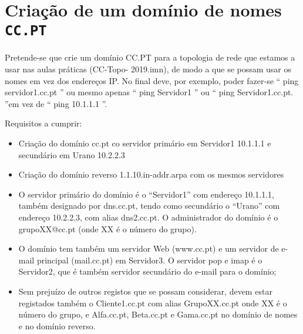 
\section{Criação de um domínio de nomes \texttt{CC.PT}}
\label{sec:dominio}

Pretende-se que crie um domínio CC.PT para a topologia de rede que estamos a usar nas aulas práticas (CC-Topo-
2019.imn), de modo a que se possam usar os nomes em vez dos endereços IP. No final deve, por exemplo, poder fazer-se “ ping
servidor1.cc.pt ” ou mesmo apenas “ ping Servidor1 ” ou “ ping Servidor1.cc.pt. ”em vez de “ ping 10.1.1.1 ”.

Requisitos a cumprir:

\begin{itemize}

  \item Criação do domínio cc.pt co servidor primário em Servidor1 10.1.1.1 e secundário em Urano 10.2.2.3
  
  \item Criação do domínio reverso 1.1.10.in-addr.arpa com os mesmos servidores
  
  \item O servidor primário do domínio é o “Servidor1” com endereço 10.1.1.1, também designado por dns.cc.pt, tendo como secundário o “Urano” com endereço 10.2.2.3, com alias dns2.cc.pt. O administrador do domínio é o grupoXX@cc.pt (onde XX é o número do grupo).

  \item O domínio tem também um servidor Web (www.cc.pt) e um servidor de e-mail principal (mail.cc.pt) em Servidor3. O servidor pop e imap é o Servidor2, que é também servidor secundário do e-mail para o domínio;

  \item Sem prejuízo de outros registos que se possam considerar, devem estar registados também o Cliente1.cc.pt com alias GrupoXX.cc.pt onde XX é o número do grupo, e Alfa.cc.pt, Beta.cc.pt e Gama.cc.pt no domínio de nomes e no domínio reverso.
  
\end{itemize}

